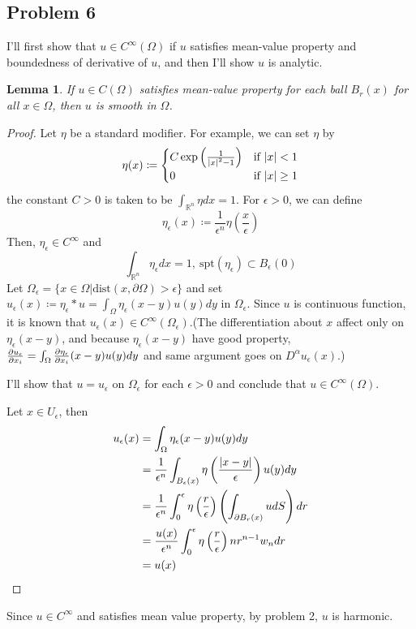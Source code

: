 \documentclass{article}
\DeclareMathOperator{\rr}{\mathbb{R}}
\newtheorem{lemma}{Lemma}
\begin{document}
\begin{enumerate}
\section*{Problem 6}
I'll first show that $u\in C^\infty(\Omega)$ if $u$ satisfies mean-value property and boundedness of derivative of $u$, and then I'll show $u$ is analytic.
\begin{lemma}
If $u\in C(\Omega)$ satisfies mean-value property for each ball $B_r(x)$ for all $x\in \Omega$, then $u$ is smooth in $\Omega$.
\end{lemma}
\begin{proof}
Let $\eta$ be a standard modifier. For example, we can set $\eta$ by
\begin{equation*}
\eta(x)\coloneqq
\begin{cases}
C\exp\left(\frac{1}{\abs{x}^2-1}\right) & \text{if }\abs{x}<1 \\
0 & \text{if } \abs{x}\geq 1
\end{cases}
\end{equation*}
the constant $C>0$ is taken to be $\int_{\rr^n} \eta dx=1$. For $\epsilon>0$, we can define
\begin{equation*}
\eta_\epsilon(x)\coloneqq \frac{1}{\epsilon^n}\eta\left(\frac{x}{\epsilon}\right)
\end{equation*}
Then, $\eta_\epsilon\in C^\infty$ and
\begin{equation*}
\int_{\rr^n} \eta_\epsilon dx=1,~\text{spt}(\eta_\epsilon)\subset B_\epsilon(0)
\end{equation*}
Let $\Omega_\epsilon=\{x\in \Omega | \text{dist}(x,\partial \Omega)>\epsilon\}$ and set $u_\epsilon(x)\coloneqq \eta_\epsilon*u=\int_{\Omega}\eta_\epsilon(x-y)u(y)dy$ in $\Omega_\epsilon$. Since $u$ is continuous function, it is known that $u_\epsilon(x)\in C^\infty(\Omega_\epsilon)$.(The differentiation about $x$ affect only on $\eta_\epsilon(x-y)$, and because $\eta_\epsilon(x-y)$ have good property, $\pdv{u_{\epsilon}}{x_i}=\int_{\Omega}\frac{\partial \eta_{\epsilon}}{\partial x_i}(x-y)u(y)dy$ and same argument goes on $D^\alpha u_\epsilon(x)$.)

I'll show that $u=u_\epsilon$ on $\Omega_\epsilon$ for each $\epsilon>0$ and conclude that $u\in C^\infty(\Omega)$.

Let $x\in U_\epsilon$, then
\begin{equation*}
\begin{split}
u_\epsilon(x)&=\int_{\Omega}\eta_\epsilon(x-y)u(y)dy\\
&=\frac{1}{\epsilon^n}\int_{B_\epsilon(x)}\eta\left(\frac{\abs{x-y}}{\epsilon}\right)u(y)dy \\
&=\frac{1}{\epsilon^n}\int_0^\epsilon\eta\left(\frac{r}{\epsilon}\right)\left(\int_{\partial B_r(x)}u dS\right)dr\\
&=\frac{u(x)}{\epsilon^n}\int_0^\epsilon\eta\left(\frac{r}{\epsilon}\right)nr^{n-1}w_n dr\\
&=u(x)
\end{split}
\end{equation*}
\end{proof}
Since $u\in C^\infty$ and satisfies mean value property, by problem 2, $u$ is harmonic.


\end{enumerate}
\end{document}
